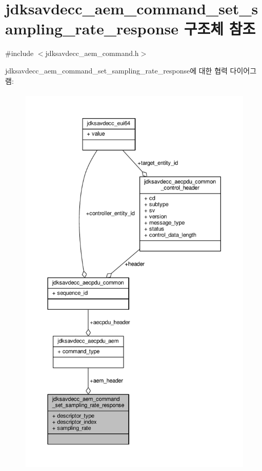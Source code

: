 \hypertarget{structjdksavdecc__aem__command__set__sampling__rate__response}{}\section{jdksavdecc\+\_\+aem\+\_\+command\+\_\+set\+\_\+sampling\+\_\+rate\+\_\+response 구조체 참조}
\label{structjdksavdecc__aem__command__set__sampling__rate__response}


{\ttfamily \#include $<$jdksavdecc\+\_\+aem\+\_\+command.\+h$>$}



jdksavdecc\+\_\+aem\+\_\+command\+\_\+set\+\_\+sampling\+\_\+rate\+\_\+response에 대한 협력 다이어그램\+:
\nopagebreak
\begin{figure}[H]
\begin{center}
\leavevmode
\includegraphics[height=550pt]{structjdksavdecc__aem__command__set__sampling__rate__response__coll__graph}
\end{center}
\end{figure}
